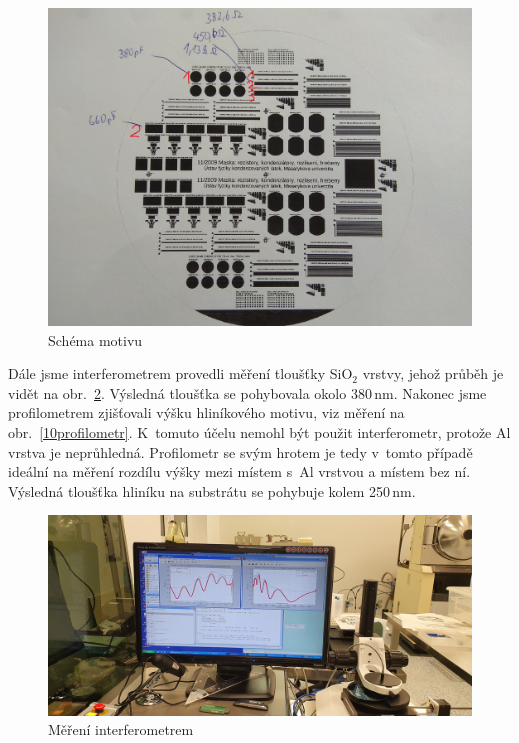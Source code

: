 \documentclass[a4paper,12pt]{article}
\begin{document}
\begin{figure}[h!]
	\centering
	\includegraphics[width=130mm]{mereni.jpg}
	\caption{Schéma motivu}
	\label{mereni}
\end{figure}

\newpage
 Dále jsme interferometrem provedli měření tloušťky SiO$_2$ vrstvy, jehož 
 průběh je vidět na obr.~\ref{9interferometr}. Výsledná tloušťka se pohybovala 
 okolo 380\,\si{\nano\meter}. Nakonec jsme profilometrem zjišťovali výšku 
 hliníkového motivu, viz měření na obr.~\ref{10profilometr}. K~tomuto účelu 
 nemohl být použit interferometr, protože Al vrstva je neprůhledná. Profilometr 
 se svým hrotem je tedy v~tomto případě ideální na měření rozdílu výšky mezi 
 místem s~Al vrstvou a místem bez ní. Výsledná tloušťka hliníku na substrátu se 
 pohybuje kolem 250\,\si{\nano\meter}.
 
\begin{figure}[h!]
	\centering
	\includegraphics[width=130mm]{9interferometr.jpg}
	\caption{Měření interferometrem}
	\label{9interferometr}
\end{figure}
\end{document}

